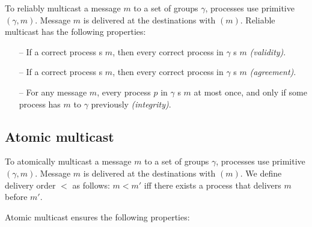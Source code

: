 To reliably multicast a message $m$ to a set of groups $\gamma$,
processes use primitive \rmcast$(\gamma, m)$.  Message $m$ is
delivered at the destinations with \rmdel$(m)$.  Reliable multicast
has the following properties:

\begin{itemize}

    \item[--] If a correct process \rmcast{}s $m$, then every correct
      process in $\gamma$ \rmdel{}s $m$ \emph{(validity)}.
    
    \item[--] If a correct process \rmdel{}s $m$, then every correct
      process in $\gamma$ \rmdel{}s $m$ \emph{(agreement)}.
    
    \item[--] For any message $m$, every process $p$ in $\gamma$
      \rmdel{}s $m$ at most once, and only if some process has
      \rmcast{} $m$ to $\gamma$ previously \emph{(integrity)}.
    
\end{itemize}

\subsection{Atomic multicast}
\label{sec:amcast}

To atomically multicast a message $m$ to a set of groups $\gamma$,
processes use primitive \amcast$(\gamma, m)$.  Message $m$ is
delivered at the destinations with \amdel$(m)$.  We define delivery
order $<$ as follows: $m < m'$ iff there exists a process that
delivers $m$ before $m'$.

Atomic multicast ensures the following properties:

